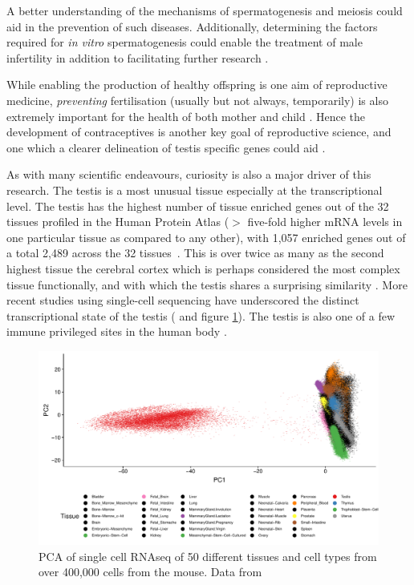 A better understanding of the mechanisms of spermatogenesis and meiosis could aid in the prevention of such diseases. Additionally, determining the factors required for \emph{in vitro} spermatogenesis could enable the treatment of male infertility in addition to facilitating further research \parencite{Zhou2016Complete}.

While enabling the production of healthy offspring is one aim of reproductive medicine, \emph{preventing} fertilisation (usually but not always, temporarily) is also extremely important for the health of both mother and child \parencite{Cleland2012Contraception}. Hence the development of contraceptives is another key goal of reproductive science, and one which a clearer delineation of testis specific genes could aid \parencite{Schultz2003multitude}.


As with many scientific endeavours, curiosity is also a major driver of this research. The testis is a most unusual tissue especially at the transcriptional level. The testis has the highest number of tissue enriched genes out of the 32 tissues profiled in the Human Protein Atlas ($>$ five-fold higher mRNA levels in one particular tissue as compared to any other), with 1,057 enriched genes out of a total 2,489 across the 32 tissues~\parencite{Djureinovic2014human,Mele2015Human, Uhlen2015Tissuebased, Uhlen2016Transcriptomics, TheHumanProteinAtlas2019human}. This is over twice as many as the second highest tissue the cerebral cortex which is perhaps considered the most complex tissue functionally, and with which the testis shares a surprising similarity \parencite{Guo2005Transcriptomic, Djureinovic2014human, Uhlen2015Tissuebased}. More recent studies using single-cell sequencing have underscored the distinct transcriptional state of the testis (\cite{Han2018Mapping} and figure \ref{fig:MCA_PCA}). The testis is also one of a few immune privileged sites in the human body \parencite{Fijak2006testis}.


\begin{figure}[H]
	\centering
	\includegraphics[width=\textwidth]{figures/intro/MCA_PCA.pdf}
	\caption[Testis PCA (MCA)]{PCA of single cell RNAseq of 50 different tissues and cell types from over 400,000 cells from the mouse. Data from~\cite{Han2018Mapping}}
	\label{fig:MCA_PCA}
\end{figure}



